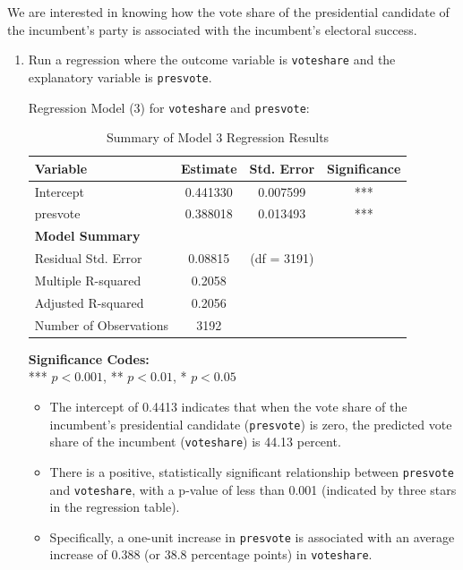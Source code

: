 \documentclass[12pt,letterpaper]{article}
\begin{document}
\noindent We are interested in knowing how the vote share of the presidential candidate of the incumbent's party is associated with the incumbent's electoral success.
\vspace{.25cm}
\noindent\begin{enumerate}[left=0pt]
		\item Run a regression where the outcome variable is \texttt{voteshare} and the explanatory variable is \texttt{presvote}.		

\vspace{0.5cm}	
\noindent Regression Model (3) for \texttt{voteshare} and \texttt{presvote}:
\noindent

\begin{table}[h!]
	\centering
	\caption{Summary of Model 3 Regression Results}
	\vspace{0.25cm}
	\begin{tabular}{lccc}
		\toprule
		\textbf{Variable} & \textbf{Estimate} & \textbf{Std. Error} & \textbf{Significance} \\ 
		\midrule
		Intercept              & 0.441330 & 0.007599 & *** \\ 
		presvote               & 0.388018 & 0.013493 & *** \\ 
		\midrule
		\textbf{Model Summary} & & & \\
		Residual Std. Error    & 0.08815  & (df = 3191) & \\ 
		Multiple R-squared     & 0.2058   & & \\ 
		Adjusted R-squared     & 0.2056   & & \\ 
		Number of Observations & 3192     & & \\ 
		\bottomrule
	\end{tabular}
\end{table}

\vspace{0.1cm}
\noindent\textbf{Significance Codes:} \\
*** $p < 0.001$, ** $p < 0.01$, * $p < 0.05$

\vspace{0.5cm} \begin{itemize}[left=0pt, label=\textbullet]
	\item The intercept of 0.4413 indicates that when the vote share of the incumbent’s presidential candidate (\texttt{presvote}) is zero, the predicted vote share of the incumbent (\texttt{voteshare}) is 44.13 percent.
	
	\item There is a positive, statistically significant relationship between \texttt{presvote} and \texttt{voteshare}, with a p-value of less than 0.001 (indicated by three stars in the regression table).
	
	\item Specifically, a one-unit increase in \texttt{presvote} is associated with an average increase of 0.388 (or 38.8 percentage points) in \texttt{voteshare}.
\end{itemize}

\end{enumerate}
\end{document}
